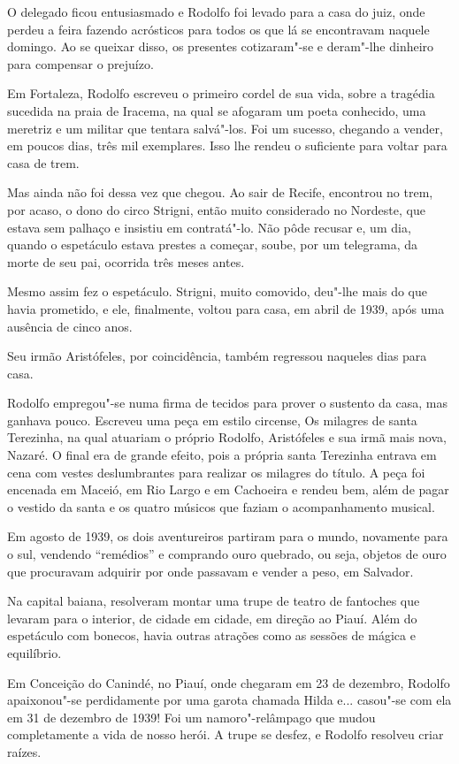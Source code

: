 O delegado ficou entusiasmado e Rodolfo foi levado para a casa do juiz,
onde perdeu a feira fazendo acrósticos para todos os que lá se
encontravam naquele domingo. Ao se queixar disso, os presentes
cotizaram"-se e deram"-lhe dinheiro para compensar o prejuízo.

Em Fortaleza, Rodolfo escreveu o primeiro cordel de sua vida, sobre a
tragédia sucedida na praia de Iracema, na qual se afogaram um poeta
conhecido, uma meretriz e um militar que tentara salvá"-los. Foi um
sucesso, chegando a vender, em poucos dias, três mil exemplares. Isso
lhe rendeu o suficiente para voltar para casa de trem.

Mas ainda não foi dessa vez que chegou. Ao sair de Recife, encontrou no
trem, por acaso, o dono do circo Strigni, então muito considerado no
Nordeste, que estava sem palhaço e insistiu em contratá"-lo. Não pôde
recusar e, um dia, quando o espetáculo estava prestes a começar, soube,
por um telegrama, da morte de seu pai, ocorrida três meses antes.

Mesmo assim fez o espetáculo. Strigni, muito comovido, deu"-lhe mais
do que havia prometido, e ele, finalmente, voltou para casa, em abril
de 1939, após uma ausência de cinco anos.

Seu irmão Aristófeles, por coincidência, também regressou naqueles dias
para casa.

Rodolfo empregou"-se numa firma de tecidos para prover o sustento da
casa, mas ganhava pouco. Escreveu uma peça em estilo circense, Os
milagres de santa Terezinha, na qual atuariam o próprio Rodolfo,
Aristófeles e sua irmã mais nova, Nazaré. O final era de grande efeito,
pois a própria santa Terezinha entrava em cena com vestes deslumbrantes
para realizar os milagres do título. A peça foi encenada em Maceió, em
Rio Largo e em Cachoeira e rendeu bem, além de pagar o vestido da santa
e os quatro músicos que faziam o acompanhamento musical.

Em agosto de 1939, os dois aventureiros partiram para o mundo,
novamente para o sul, vendendo ``remédios'' e
comprando ouro quebrado, ou seja, objetos de ouro que procuravam
adquirir por onde passavam e vender a peso, em Salvador.

Na capital baiana, resolveram montar uma trupe de teatro de fantoches
que levaram para o interior, de cidade em cidade, em direção ao Piauí.
Além do espetáculo com bonecos, havia outras atrações como as sessões
de mágica e equilíbrio.

Em Conceição do Canindé, no Piauí, onde chegaram em 23 de dezembro,
Rodolfo apaixonou"-se perdidamente por uma garota chamada Hilda e...
casou"-se com ela em 31 de dezembro de 1939! Foi um namoro"-relâmpago
que mudou completamente a vida de nosso herói. A trupe se desfez, e
Rodolfo resolveu criar raízes.

